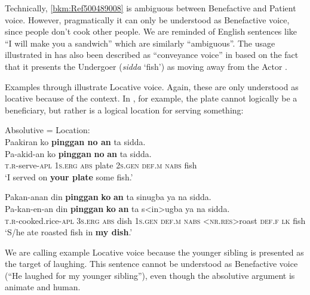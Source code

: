 Technically, \ref{bkm:Ref500489008} is ambiguous between Benefactive and Patient voice. However, pragmatically it can only be understood as Benefactive voice, since people don’t cook other people. We are reminded of English sentences like “I will make you a sandwich” which are similarly “ambiguous”. The usage illustrated in  has also been described as “conveyance voice” in  based on the fact that it presents the Undergoer (\textit{sidda} ‘fish’) as moving away from the Actor \citep[69]{wolff1973}.

\largerpage
Examples  through  illustrate Locative voice. Again, these are only understood as locative because of the context. In , for example, the plate cannot logically be a beneficiary, but rather is a logical location for serving something:

\ea
\label{bkm:Ref500490084}
Absolutive = Location: \\
Paakiran  ko  \textbf{pinggan  no  an}  ta  sidda. \\\smallskip
\gll Pa-akid-an  ko \emptyset{} \textbf{pinggan}  \textbf{no}  \textbf{an}  ta  sidda. \\
\textsc{t.r}-serve-\textsc{apl}  1\textsc{s.erg}  \textsc{abs}  plate  2\textsc{s.gen}  \textsc{def.m}  \textsc{nabs}  fish \\
\glt ‘I served on \textbf{your plate} some fish.’
\z


\ea
Pakan-anan  din  \textbf{pinggan}  \textbf{ko}  \textbf{an} ta sinugba    ya  na  sidda. \\\smallskip
\gll Pa-kan-en-an\footnotemark{}  din  \emptyset{}  \textbf{pinggan}  \textbf{ko}  \textbf{an} ta s<in>ugba    ya  na  sidda. \\
\textsc{t.r}-cooked.rice-\textsc{apl}  3\textsc{s.erg}  \textsc{abs}  dish  1\textsc{s.gen}  \textsc{def.m}
\textsc{nabs} <\textsc{nr.res}>roast \textsc{def.f}  \textsc{lk}  fish \\
\glt ‘S/he ate roasted fish in \textbf{my dish}.’
\z

We are calling example  Locative voice because the younger sibling is presented as the target of laughing. This sentence cannot be understood as Benefactive voice (“He laughed for my younger sibling”), even though the absolutive argument is animate and human.

